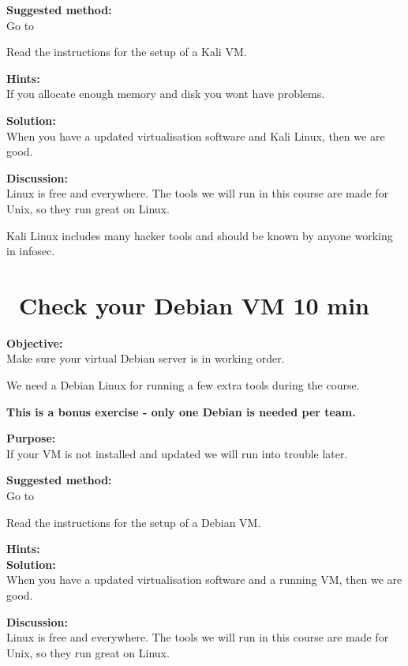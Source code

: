 \documentclass[a4paper,11pt,notitlepage]{report}
\begin{document}
{\bf Suggested method:}\\
Go to 

Read the instructions for the setup of a Kali VM.

{\bf Hints:}\\
If you allocate enough memory and disk you wont have problems.

{\bf Solution:}\\
When you have a updated virtualisation software and Kali Linux, then we are good.

{\bf Discussion:}\\
Linux is free and everywhere. The tools we will run in this course are made for Unix, so they run great on Linux.

Kali Linux includes many hacker tools and should be known by anyone working in infosec.

\chapter{\faExclamationTriangle\ Check your Debian VM 10 min}
\label{ex:sw-basicDebianVM}


{\bf Objective:}\\
Make sure your virtual Debian server is in working order.

We need a Debian Linux for running a few extra tools during the course.

{\Large \bf This is a bonus exercise - only one Debian is needed per team.}

{\bf Purpose:}\\
If your VM is not installed and updated we will run into trouble later.

{\bf Suggested method:}\\
Go to 

Read the instructions for the setup of a Debian VM.

{\bf Hints:}\\

{\bf Solution:}\\
When you have a updated virtualisation software and a running VM, then we are good.

{\bf Discussion:}\\
Linux is free and everywhere. The tools we will run in this course are made for Unix, so they run great on Linux.
\end{document}
